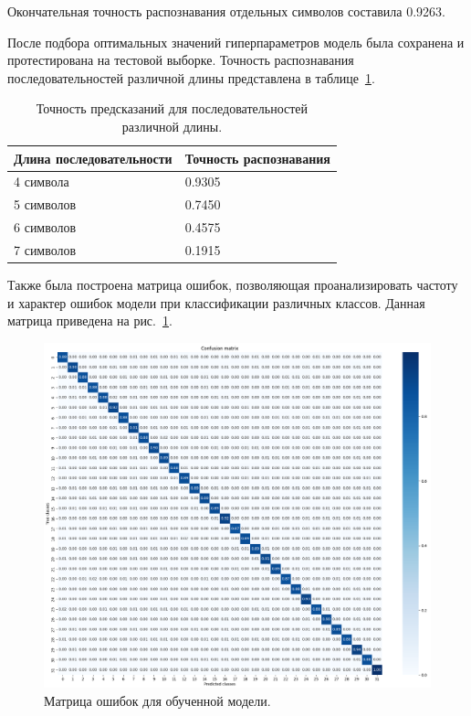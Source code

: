 Окончательная точность распознавания отдельных символов составила 0.9263.

После подбора оптимальных значений гиперпараметров модель была сохранена и 
протестирована на тестовой выборке. Точность распознавания последовательностей 
различной длины представлена в таблице~\ref{tab:probability}.

\begin{table}[H]
    \centering
    \caption{Точность предсказаний для последовательностей различной длины.}
    \begin{tabular}{|l|l|}
        \hline
        Длина последовательности & Точность распознавания \\
        \hline
        4 символа & 0.9305 \\
        \hline
        5 символов & 0.7450 \\
        \hline
        6 символов & 0.4575 \\
        \hline
        7 символов & 0.1915 \\
        \hline
    \end{tabular}
    \label{tab:probability}
\end{table}

Также была построена матрица ошибок, позволяющая проанализировать частоту и 
характер ошибок модели при классификации различных классов. Данная матрица 
приведена на рис.~\ref{fig:cm}.

\begin{figure}[H]
    \centering
    \includegraphics[width=1\linewidth]{imgs/textcaptcha/Confusion_matrix.png}
    \caption{Матрица ошибок для обученной модели.}
    \label{fig:cm}
\end{figure}

